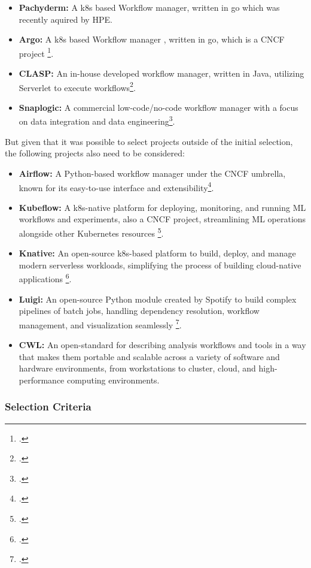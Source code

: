 \begin{itemize}
    \item \textbf{Pachyderm:} A \ac{k8s} based Workflow manager, written in go which was recently aquired by \ac{HPE}.
    \item \textbf{Argo:} A \ac{k8s} based Workflow manager , written in go, which is a \ac{CNCF} project \footcite{ArgoprojArgoworkflows2023}.
    \item \textbf{\ac{CLASP}:}  An in-house developed workflow manager, written in Java, utilizing Serverlet to execute workflows\footcite{sayersCloudApplicationServices2015}.
    \item \textbf{Snaplogic:} A commercial low-code/no-code workflow manager with a focus on data integration and data engineering\footcite{IPaaSSolutionEnterprise}.
\end{itemize}

But given that it was possible to select projects outside of the initial selection, the following projects also need to be considered:


\begin{itemize}
    \item \textbf{Airflow:} A Python-based workflow manager under the \ac{CNCF} umbrella, known for its easy-to-use interface and extensibility\footcite{hainesWorkflowOrchestrationApache2022}.
    \item \textbf{Kubeflow:} A \ac{k8s}-native platform for deploying, monitoring, and running ML workflows and experiments, also a \ac{CNCF} project, streamlining \ac{ML} operations alongside other Kubernetes resources \footcite{Kubeflow}.
    \item \textbf{Knative:} An open-source \ac{k8s}-based platform to build, deploy, and manage modern serverless workloads, simplifying the process of building cloud-native applications \footcite{HomeKnative}.
    \item \textbf{Luigi:} An open-source Python module created by Spotify to build complex pipelines of batch jobs, handling dependency resolution, workflow management, and visualization seamlessly \footcite{SpotifyLuigi2023}.
    \item \textbf{\ac{CWL}:} An open-standard for describing analysis workflows and tools in a way that makes them portable and scalable across a variety of software and hardware environments, from workstations to cluster, cloud, and high-performance computing environments.
\end{itemize}
    
\subsubsection{Selection Criteria}

